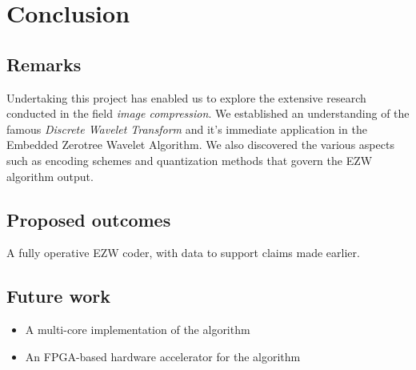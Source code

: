 \documentclass[./A14_Report.tex]{subfiles}
\begin{document}
\chapter{Conclusion}
\section{Remarks}
Undertaking this project has enabled us to explore the extensive research
conducted in the field \textit{image compression}. We established an
understanding of the famous \textit{Discrete Wavelet Transform} and it's
immediate application in the Embedded Zerotree Wavelet Algorithm. We also
discovered the various aspects such as encoding schemes and quantization
methods that govern the EZW algorithm output.

\section{Proposed outcomes}
A fully operative EZW coder, with data to support claims made earlier.

\section{Future work}
\begin{itemize}
    \item A multi-core implementation of the algorithm
    \item An FPGA-based hardware accelerator for the algorithm
\end{itemize}
\end{document}
